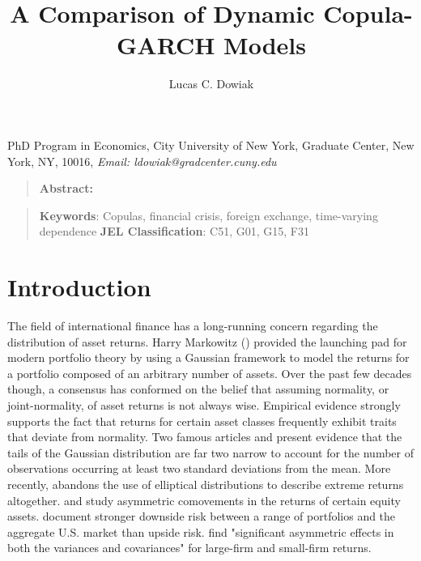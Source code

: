 \documentclass[12pt]{article}
\title{A Comparison of Dynamic Copula-GARCH Models}
\author{Lucas C. Dowiak}
\begin{document}
 
\maketitle{}
 
PhD Program in Economics, City University of New York\smallskip, Graduate Center,
New York, NY, 10016, \textit{Email: ldowiak@gradcenter.cuny.edu}

\qquad

\begin{quotation}
\textbf{Abstract:}
\end{quotation}

\vspace{1pt}

\begin{quotation}
\textbf{Keywords}: Copulas, financial crisis, foreign exchange, time-varying dependence
\textbf{JEL Classification}: C51, G01, G15, F31
\end{quotation}

\vspace{1pt}

\section{Introduction}

The field of international finance has a long-running concern regarding the distribution of asset returns. Harry Markowitz (\cite{Markowitz_1952, Markowitz_1959}) provided the launching pad for modern portfolio theory by using a Gaussian framework to model the returns for a portfolio composed of an arbitrary number of assets. Over the past few decades though, a consensus has conformed on the belief that assuming normality, or joint-normality, of asset returns is not always wise. Empirical evidence strongly supports the fact that returns for certain asset classes frequently exhibit traits that deviate from normality. Two famous articles \cite{Mandelbrot_1963} and \cite{Fama_1965} present evidence that the tails of the Gaussian distribution are far two narrow to account for the number of observations occurring at least two standard deviations from the mean. More recently, \cite{Longin_1996} abandons the use of elliptical distributions to describe extreme returns altogether. \cite{Ang_and_Chen_2002} and \cite{Kroner_and_Ng_1998} study asymmetric comovements in the returns of certain equity assets. \cite{Ang_and_Chen_2002} document stronger downside risk between a range of portfolios and the aggregate U.S. market than upside risk. \cite{Kroner_and_Ng_1998} find "significant asymmetric effects in both the variances and covariances" for large-firm and small-firm returns.
\end{document}
